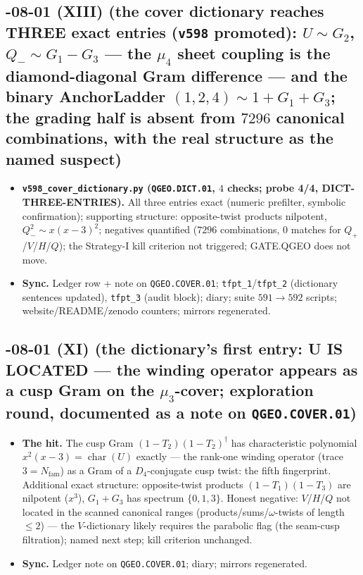 \documentclass[11pt]{article}
\begin{document}
\subsection*{-08-01 (XIII) (the cover dictionary reaches THREE exact entries (\texttt{v598} promoted): $U\sim G_2$, $Q_-\sim G_1-G_3$ --- the $\mu_4$ sheet coupling is the diamond-diagonal Gram difference --- and the binary AnchorLadder $(1,2,4)\sim1+G_1+G_3$; the grading half is absent from $7296$ canonical combinations, with the real structure as the named suspect)}
\begin{itemize}[leftmargin=1.5em]
\item \textbf{\texttt{v598\_cover\_dictionary.py} (\texttt{QGEO.DICT.01}, $4$ checks; probe
4/4, DICT-THREE-ENTRIES).} All three entries exact (numeric prefilter, symbolic
confirmation); supporting structure: opposite-twist products nilpotent, $Q_-^2\sim x(x-3)^2$;
negatives quantified ($7296$ combinations, $0$ matches for $Q_+$/$V$/$H$/$Q$); the
Strategy-I kill criterion not triggered; GATE.QGEO does not move.
\item \textbf{Sync.} Ledger row + note on \texttt{QGEO.COVER.01};
\texttt{tfpt\_1}/\texttt{tfpt\_2} (dictionary sentences updated), \texttt{tfpt\_3} (audit
block); diary; suite $591\to592$ scripts; website/README/zenodo counters; mirrors
regenerated.
\end{itemize}

\subsection*{-08-01 (XI) (the dictionary's first entry: U IS LOCATED --- the winding operator appears as a cusp Gram on the $\mu_3$-cover; exploration round, documented as a note on \texttt{QGEO.COVER.01})}
\begin{itemize}[leftmargin=1.5em]
\item \textbf{The hit.} The cusp Gram $(1-T_2)(1-T_2)^\dagger$ has characteristic polynomial
$x^2(x-3)=\operatorname{char}(U)$ exactly --- the rank-one winding operator (trace $3=N_{\mathrm{fam}}$)
as a Gram of a $D_4$-conjugate cusp twist: the fifth fingerprint.  Additional exact structure:
opposite-twist products $(1-T_1)(1-T_3)$ are nilpotent ($x^3$), $G_1+G_3$ has spectrum
$\{0,1,3\}$.  Honest negative: $V$/$H$/$Q$ not located in the scanned canonical ranges
(products/sums/$\omega$-twists of length $\le2$) --- the $V$-dictionary likely requires the
parabolic flag (the seam-cusp filtration); named next step; kill criterion unchanged.
\item \textbf{Sync.} Ledger note on \texttt{QGEO.COVER.01}; diary; mirrors regenerated.
\end{itemize}
\end{document}
